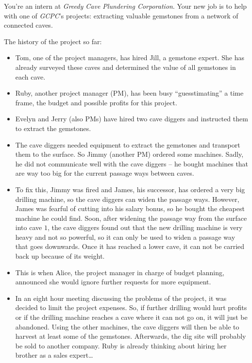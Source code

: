 You're an intern at \emph{Greedy Cave Plundering Corporation}.
Your new job is to help with one of \emph{GCPC}'s projects:
extracting valuable gemstones from a network of connected caves.

The history of the project so far:
\begin{itemize}
	\item Tom, one of the project managers, has hired Jill, a gemstone expert.
	She has already surveyed these caves and determined the value of all gemstones in each cave.
	\item Ruby, another project manager (PM), has been busy ``guesstimating'' a time frame, the budget and possible profits for this project.
	\item Evelyn and Jerry (also PMs) have hired two cave diggers and instructed them to extract the gemstones.
	\item The cave diggers needed equipment to extract the gemstones and transport them to the surface.
	So Jimmy (another PM) ordered some machines.
	Sadly, he did not communicate well with the cave diggers -- he bought machines that are way too big for the current passage ways between caves.
	\item To fix this, Jimmy was fired and James, his successor, has ordered a very big drilling machine, so the cave diggers can widen the passage ways.
	However, James was fearful of cutting into his salary bonus, so he bought the cheapest machine he could find.
	Soon, after widening the passage way from the surface into cave $1$, the cave diggers found out that the new drilling machine is very heavy and not so powerful, so it can only be used to widen a passage way that goes downwards.
	Once it has reached a lower cave, it can not be carried back up because of its weight.
	\item This is when Alice, the project manager in charge of budget planning, announced she would ignore further requests for more equipment.
	\item In an eight hour meeting discussing the problems of the project, it was decided to limit the project expenses.
	So, if further drilling would hurt profits or if the drilling machine reaches a cave where it can not go on, it will just be abandoned.
	Using the other machines, the cave diggers will then be able to harvest at least some of the gemstones.
	Afterwards, the dig site will probably be sold to another company.
	Ruby is already thinking about hiring her brother as a sales expert\dots
\end{itemize}

